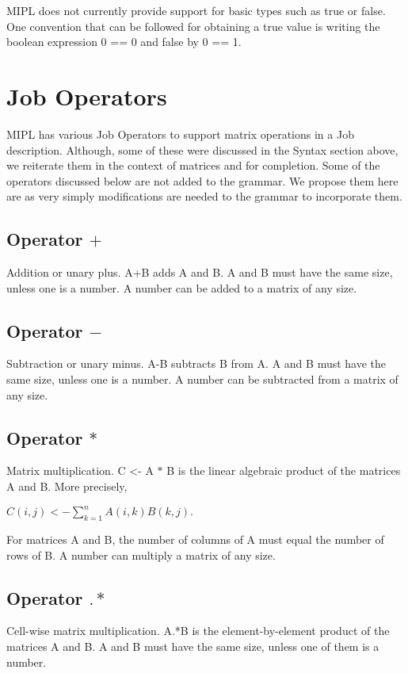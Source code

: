 \documentclass[prodmode,acmtecs]{acmsmall}
\begin{document}
MIPL does not currently provide support for basic
types such as true or false. One convention that can be followed for obtaining
a true value is writing the boolean expression 0 == 0 and false by 0 == 1. 

\medskip


\section{Job Operators}
MIPL has various Job Operators to support matrix operations in a Job
description. Although, some of these were discussed in the Syntax
section above, we reiterate them in the context of matrices and for
completion. Some of the operators discussed below are not added to 
the grammar. We propose them here are as very simply modifications 
are needed to the grammar to incorporate them.

\subsection{Operator $+$}
Addition or unary plus. A+B adds A and B. A and B must have the same size,
unless one is a number. A number can be added to a matrix of any size.
\medskip

\subsection{Operator $-$}
Subtraction or unary minus. A-B subtracts B from A. A and B must have the
same size, unless one is a number. A number can be subtracted from a matrix
of any size.
\medskip

\subsection{Operator $*$}
Matrix multiplication. C <- A $*$ B is the linear algebraic product of the
matrices A and B. More precisely,

$C(i,j) <- \displaystyle\sum\limits_{k=1}^n A(i,k)B(k,j).$

For matrices A and B, the number of columns of A must equal the number of
rows of B. A number can multiply a matrix of any size.
\medskip

\subsection{Operator $.*$}
Cell-wise matrix multiplication. A.*B is the element-by-element product
of the matrices A and B. A and B must have the same size, unless one of
them is a number.
\medskip
\end{document}
